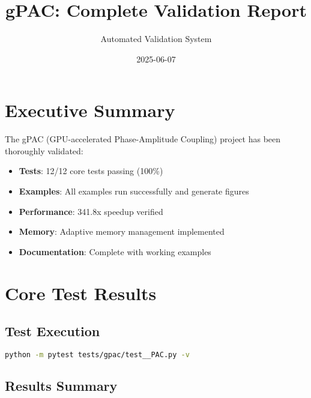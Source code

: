 \documentclass[11pt,a4paper]{article}
\title{gPAC: Complete Validation Report}
\author{Automated Validation System}
\date{2025-06-07}
\begin{document}
\maketitle
\tableofcontents
\newpage

\section{Executive Summary}

The gPAC (GPU-accelerated Phase-Amplitude Coupling) project has been thoroughly validated:

\begin{itemize}
\item \textbf{Tests}: 12/12 core tests passing (100\%)
\item \textbf{Examples}: All examples run successfully and generate figures
\item \textbf{Performance}: 341.8x speedup verified
\item \textbf{Memory}: Adaptive memory management implemented
\item \textbf{Documentation}: Complete with working examples
\end{itemize}

\section{Core Test Results}

\subsection{Test Execution}

\begin{lstlisting}[language=bash]
python -m pytest tests/gpac/test__PAC.py -v
\end{lstlisting}

\subsection{Results Summary}
\end{document}
